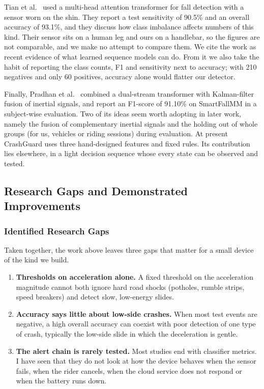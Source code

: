 \documentclass[10pt,a4paper]{article}
\begin{document}
Tian et al.~\cite{tian2026transformer} used a multi-head attention transformer for fall detection with a sensor worn on the shin. They report a test sensitivity of 90.5\% and an overall accuracy of 93.1\%, and they discuss how class imbalance affects numbers of this kind. Their sensor sits on a human leg and ours on a handlebar, so the figures are not comparable, and we make no attempt to compare them. We cite the work as recent evidence of what learned sequence models can do. From it we also take the habit of reporting the class counts, F1 and sensitivity next to accuracy; with 210 negatives and only 60 positives, accuracy alone would flatter our detector.

Finally, Pradhan et al.~\cite{dual2026} combined a dual-stream transformer with Kalman-filter fusion of inertial signals, and report an F1-score of 91.10\% on SmartFallMM in a subject-wise evaluation. Two of its ideas seem worth adopting in later work, namely the fusion of complementary inertial signals and the holding out of whole groups (for us, vehicles or riding sessions) during evaluation. At present CrashGuard uses three hand-designed features and fixed rules. Its contribution lies elsewhere, in a light decision sequence whose every state can be observed and tested.

\subsection{Research Gaps and Demonstrated Improvements}

\subsubsection*{Identified Research Gaps}
Taken together, the work above leaves three gaps that matter for a small device of the kind we build.
\begin{enumerate}[label=\textbf{Gap \arabic*:}]
\item \textbf{Thresholds on acceleration alone.} A fixed threshold on the acceleration magnitude cannot both ignore hard road shocks (potholes, rumble strips, speed breakers) and detect slow, low-energy slides.
\item \textbf{Accuracy says little about low-side crashes.} When most test events are negative, a high overall accuracy can coexist with poor detection of one type of crash, typically the low-side slide in which the deceleration is gentle.
\item \textbf{The alert chain is rarely tested.} Most studies end with classifier metrics. I have seen that they do not look at how the device behaves when the sensor fails, when the rider cancels, when the cloud service does not respond or when the battery runs down.
\end{enumerate}
\end{document}
